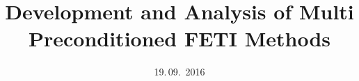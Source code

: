 
\usepackage{booktabs}
\usepackage{pdflscape}
\usepackage{longtable}
\usepackage{footnote}
\usepackage{import}
\usepackage{subcaption}
\usepackage{mycommands}


\usepackage{amsmath}
\usepackage{amsfonts}
\usepackage{amssymb}

\usepackage{graphicx}
\usepackage{pgfplots}
\usepackage{pgfplotstable}


\usepackage{struktex}

\usepackage{kbordermatrix}
\usepackage{blkarray}%

\usepackage[font={small,it}]{caption}

\usepackage[outline]{contour}












\author{}
\title{Development and Analysis of Multi Preconditioned FETI Methods}
\date{19.\,09.~2016}
